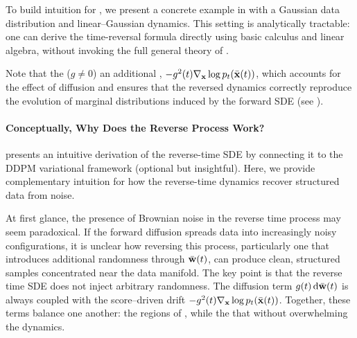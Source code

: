 
To build intuition for , we present a concrete example in  with a Gaussian data distribution and linear–Gaussian dynamics. This setting is analytically tractable: one can derive the time-reversal formula directly using basic calculus and linear algebra, without invoking the full general theory of \citet{anderson1982reverse}.

Note that the  ($g\neq 0$)  an additional , $ -g^2(t) \nabla_{{\mathbf{x}}} \log p_t(\bar{{\mathbf{x}}}(t))$, which accounts for the effect of diffusion and ensures that the reversed dynamics correctly reproduce the evolution of marginal distributions induced by the forward SDE (see ).

\paragraph{Conceptually, Why Does the Reverse Process Work?}  presents an intuitive derivation of the reverse-time SDE by connecting it to the DDPM variational framework (optional but insightful). Here, we provide complementary intuition for how the reverse-time dynamics recover structured data from noise. 


At first glance, the presence of Brownian noise in the reverse time process may seem paradoxical. If the forward diffusion spreads data into increasingly noisy configurations, it is unclear how reversing this process, particularly one that introduces additional randomness through $\bar{{\mathbf{w}}}(t)$, can produce clean, structured samples concentrated near the data manifold. The key point is that the reverse time SDE does not inject arbitrary randomness. The diffusion term $g(t)\mathop{}\!\mathrm{d}\bar{{\mathbf{w}}}(t)$ is always coupled with the score–driven drift $- g^2(t)\nabla_{{\mathbf{x}}}\log p_t(\bar{{\mathbf{x}}}(t))$. Together, these terms balance one another: the  regions of , while the  that  without overwhelming the dynamics.

